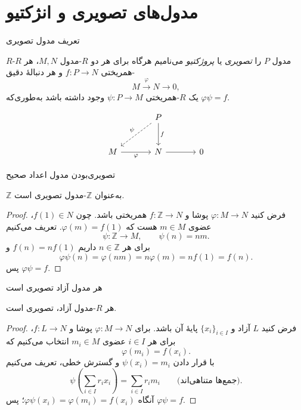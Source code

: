 \section{مدول‌های تصویری و انژکتیو}

\begin{frame}[t]{تعریف مدول تصویری}
\label{lec17:projective-definition}
\begin{definition}
$R$-مدول $P$ را \textit{تصویری} یا \textit{پروژکتیو} می‌نامیم هرگاه برای هر
دو $R$-مدول $M,N$، هر $R$-همریختی $f:P\to N$ و هر دنبالهٔ دقیق
\[
M\xrightarrow{\varphi}N\longrightarrow0,
\]
یک $R$-همریختی $\psi:P\to M$ وجود داشته باشد به‌طوری‌که
$\varphi\psi=f$.
\end{definition}
\[
\begin{tikzcd}[ampersand replacement=\&,column sep=large,row sep=large]
\& P\arrow[d,"f"]\arrow[dl,dashed,"\psi"'] \& \\
M\arrow[r,"\varphi"']\&N\arrow[r]\&0
\end{tikzcd}
\]
\end{frame}

\begin{frame}[t]{تصویری‌بودن مدول اعداد صحیح}
\label{lec17:integers-projective}
\begin{example}
$\mathbb Z$ به‌عنوان $\mathbb Z$-مدول تصویری است.
\end{example}
\begin{proof}
فرض کنید $\varphi:M\to N$ پوشا و $f:\mathbb Z\to N$ همریختی باشد.
چون $f(1)\in N$، عضوی $m\in M$ هست که $\varphi(m)=f(1)$.
تعریف می‌کنیم
\[
\psi:\mathbb Z\longrightarrow M,\qquad \psi(n)=nm.
\]
برای هر $n\in\mathbb Z$ داریم $f(n)=nf(1)$ و
\[
\varphi\psi(n)=\varphi(nm)=n\varphi(m)=nf(1)=f(n).
\]
پس $\varphi\psi=f$.
\end{proof}
\end{frame}

\begin{frame}[t]{هر مدول آزاد تصویری است}
\label{lec17:free-is-projective}
\begin{theorem}
هر $R$-مدول آزاد، تصویری است.
\end{theorem}
\begin{proof}
فرض کنید $L$ آزاد و $\{x_i\}_{i\in I}$ پایهٔ آن باشد.
برای $\varphi:M\to N$ پوشا و $f:L\to N$، برای هر $i\in I$ عضوی
$m_i\in M$ انتخاب می‌کنیم که
\[
\varphi(m_i)=f(x_i).
\]
با قرار دادن $\psi(x_i)=m_i$ و گسترش خطی، تعریف می‌کنیم
\[
\psi\!\left(\sum_{i\in I}r_ix_i\right)=\sum_{i\in I}r_im_i
\qquad\text{(جمع‌ها متناهی‌اند).}
\]
آنگاه $\varphi\psi(x_i)=\varphi(m_i)=f(x_i)$؛ پس $\varphi\psi=f$.
\end{proof}
\end{frame}

